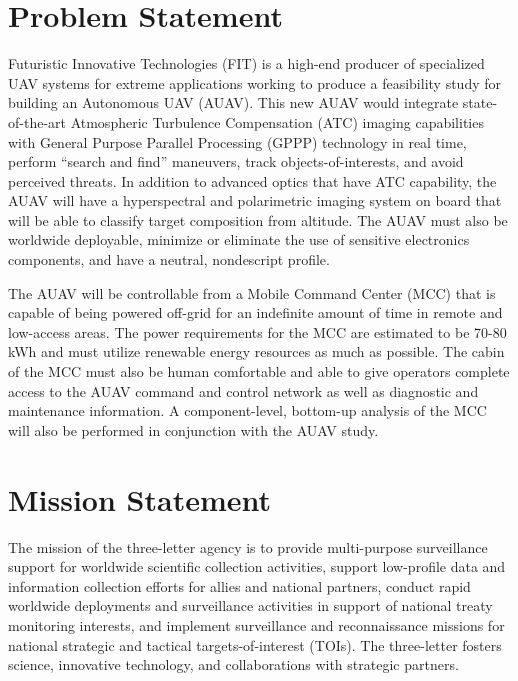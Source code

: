\begin{fullwidth}
\section{Problem Statement}
    Futuristic Innovative Technologies (FIT) is a high-end producer of specialized UAV systems for extreme applications working to produce a feasibility study for building an Autonomous UAV (AUAV). This new AUAV would integrate state-of-the-art Atmospheric Turbulence Compensation (ATC) imaging capabilities with General Purpose Parallel Processing (GPPP) technology in real time, perform “search and find” maneuvers, track objects-of-interests, and avoid perceived threats. In addition to advanced optics that have ATC capability, the AUAV will have a hyperspectral and polarimetric imaging system on board that will be able to classify target composition from altitude. The AUAV must also be worldwide deployable, minimize or eliminate the use of sensitive electronics components, and have a neutral, nondescript profile.
    
    The AUAV will be controllable from a Mobile Command Center (MCC) that is capable of being powered off-grid for an indefinite amount of time in remote and low-access areas. The power requirements for the MCC are estimated to be 70-80 kWh and must utilize renewable energy resources as much as possible. The cabin of the MCC must also be human comfortable and able to give operators complete access to the AUAV command and control network as well as diagnostic and maintenance information. A component-level, bottom-up analysis of the MCC will also be performed in conjunction with the AUAV study.

\section{Mission Statement}
    The mission of the three-letter agency is to provide multi-purpose surveillance support for worldwide scientific collection activities, support low-profile data and information collection efforts for allies and national partners, conduct rapid worldwide deployments and surveillance activities in support of national treaty monitoring interests, and implement surveillance and reconnaissance missions for national strategic and tactical targets-of-interest (TOIs). The three-letter fosters science, innovative technology, and collaborations with strategic partners. 
    
\end{fullwidth}